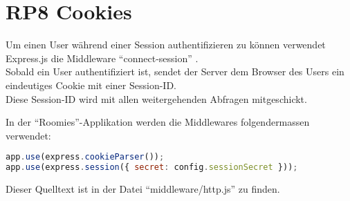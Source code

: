 \section{RP8 Cookies}
\label{sec:principle-rp8-cookies}
Um einen User während einer Session authentifizieren zu können verwendet Express.js
\cite{Expressjs} die \gls{Middleware} ``connect-session'' \cite{ConnectSession}.\\
Sobald ein User authentifiziert ist, sendet der Server dem Browser des Users ein eindeutiges
Cookie mit einer Session-ID.\\
Diese Session-ID wird mit allen weitergehenden Abfragen mitgeschickt.

In der ``Roomies''-Applikation werden die Middlewares folgendermassen verwendet:

\begin{lstlisting}[language=JavaScript, caption=Connect Session/Cookie Middleware, label=lst:connect-session-middleware]
app.use(express.cookieParser());
app.use(express.session({ secret: config.sessionSecret }));
\end{lstlisting}

Dieser Quelltext ist in der Datei ``middleware/http.js'' \cite{RoomiesMiddlewareHttp} zu finden.